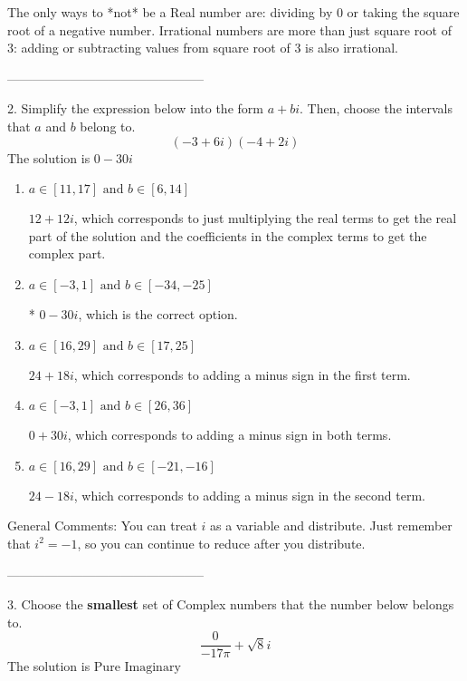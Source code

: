\documentclass{extbook}[14pt]
\begin{document}
 The only ways to *not* be a Real number are: dividing by 0 or taking the square root of a negative number. Irrational numbers are more than just square root of 3: adding or subtracting values from square root of 3 is also irrational.

-----------------------------------------------

2. Simplify the expression below into the form $a+bi$. Then, choose the intervals that $a$ and $b$ belong to.
\[ (-3  + 6 i)(-4  + 2 i) \] 
The solution is $ 0  - 30 i $ 

\begin{enumerate}[label=\Alph*.] 
\item $ a \in [11, 17] \text{ and } b \in [6, 14] $ 

  $12  + 12 i$, which corresponds to just multiplying the real terms to get the real part of the solution and the coefficients in the complex terms to get the complex part. 
\item $ a \in [-3, 1] \text{ and } b \in [-34, -25] $ 

 * $0  - 30 i$, which is the correct option. 
\item $ a \in [16, 29] \text{ and } b \in [17, 25] $ 

  $24  + 18 i$, which corresponds to adding a minus sign in the first term. 
\item $ a \in [-3, 1] \text{ and } b \in [26, 36] $ 

  $0  + 30 i$, which corresponds to adding a minus sign in both terms. 
\item $ a \in [16, 29] \text{ and } b \in [-21, -16] $ 

  $24  - 18 i$, which corresponds to adding a minus sign in the second term. 
\end{enumerate} 
 
General Comments: You can treat $i$ as a variable and distribute. Just remember that $i^2=-1$, so you can continue to reduce after you distribute.

-----------------------------------------------

3. Choose the \textbf{smallest} set of Complex numbers that the number below belongs to.
\[ \frac{0}{-17 \pi}+\sqrt{8}i \] 
The solution is $ \text{Pure Imaginary} $ 
\end{document}

